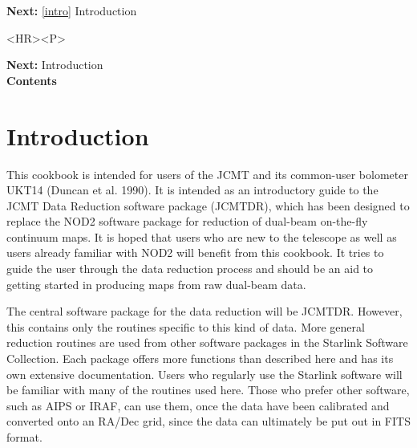 \documentclass[11pt]{article}
\newcommand{\htmladdnormallink}[2]{#1}
\newenvironment{latexonly}{}{}
\newcommand{\htmlref}[2]{#1}
\newcommand{\xref}[3]{#1}
\newcommand{\xlabel}[1]{}
\begin{document}
\begin{latexonly}
{\bf Next:} \ref{intro} Introduction\\
\end{latexonly}

\begin{htmlonly}
\begin{rawhtml} <HR><P> \end{rawhtml}
{\bf \htmlref{Next:}{intro}} Introduction\\
{\bf \htmlref{Contents}{stardoccontents}}\\
\end{htmlonly}


\section{\label{intro}\xlabel{intro}Introduction}

   This cookbook is intended for users of the
\htmladdnormallink{JCMT}{http://www.jach.hawaii.edu/JCMT/index.html}
   and its common-user bolometer UKT14
\htmlref{(Duncan et al. 1990).}{refer}
   It is intended as an introductory guide to the JCMT Data Reduction
   software package
\xref{(JCMTDR),}{sun132}{}
   which has been designed to replace the
\htmlref{NOD2}{glossnod2}
   software package for reduction of
\htmlref{dual-beam}{glossdualbeam}
\htmlref{on-the-fly}{glossonthefly}
   continuum maps. It is hoped that users who are new to the telescope
   as well as users already familiar with NOD2 will benefit from this
   cookbook. It tries to guide the user through the data reduction
   process and should be an aid to
   getting started in producing maps from raw dual-beam data.

   The central software package for the data reduction will be JCMTDR.
   However, this contains only the routines specific to this kind of
   data. More general reduction routines are
\htmlref{used from other software packages}{packs}
   in the
\htmladdnormallink{Starlink Software Collection.}{http://www.starlink.ac.uk/software.html}
   Each package offers
   more functions than described here and has its own extensive
   documentation.
   Users who regularly use the Starlink software will be familiar with
   many of the routines used here. Those who prefer other software,
   such as AIPS or IRAF, can use them, once the data have been
   calibrated and converted onto an RA/Dec grid, since the data
   can ultimately be put out in
\htmlref{FITS format.}{glossfits}
\end{document}
